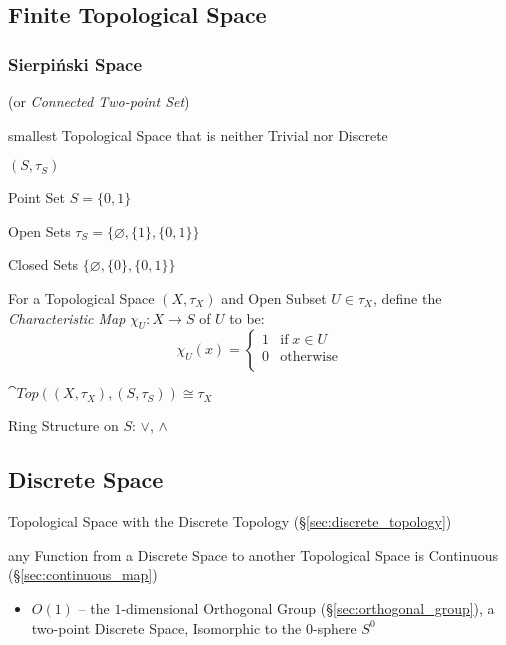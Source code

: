 \subsection{Finite Topological Space}
\label{sec:finite_topological_space}

\subsubsection{Sierpi\'nski Space}\label{sec:sierpinski_space}

(or \emph{Connected Two-point Set})

smallest Topological Space that is neither Trivial nor Discrete

$(S,\tau_S)$

Point Set $S = \{0,1\}$

Open Sets $\tau_S = \{\varnothing, \{1\}, \{0,1\}\}$

Closed Sets $\{\varnothing, \{0\}, \{0,1\}\}$

For a Topological Space $(X,\tau_X)$ and Open Subset $U \in \tau_X$,
define the \emph{Characteristic Map} $\chi_U : X \rightarrow S$ of $U$ to be:
\[
  \chi_U (x) =
  \begin{cases}
    1  & \text{if}\; x \in U \\
    0  & \text{otherwise} \\
  \end{cases}
\]

$\cat{Top}((X,\tau_X),(S,\tau_S)) \cong \tau_X$

Ring Structure on $S$: $\vee$, $\wedge$



\subsection{Discrete Space}\label{sec:discrete_space}

Topological Space with the Discrete Topology (\S\ref{sec:discrete_topology})

any Function from a Discrete Space to another Topological Space is Continuous
(\S\ref{sec:continuous_map})

\begin{itemize}
  \item $O(1)$ -- the $1$-dimensional Orthogonal Group
    (\S\ref{sec:orthogonal_group}), a two-point Discrete Space, Isomorphic to
    the $0$-sphere $S^0$
\end{itemize}



